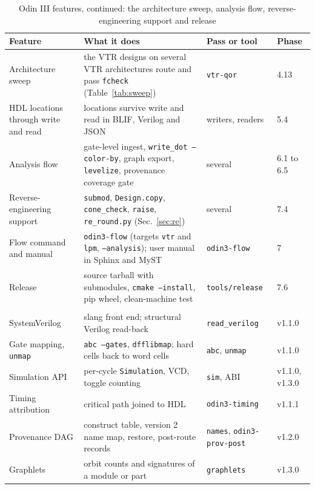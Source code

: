 \documentclass[conference]{IEEEtran}
\newcommand{\code}[1]{\texttt{#1}}
\begin{document}
\begin{table}[!tp]
\caption{Odin III features, continued: the architecture sweep, analysis flow, reverse-engineering support and release}
\label{tab:features2}
\centering
\footnotesize
\begin{tabular}{@{}>{\raggedright\arraybackslash}p{}%
  >{\raggedright\arraybackslash}p{}%
  >{\raggedright\arraybackslash}p{}p{}@{}}
\toprule
Feature & What it does & Pass or tool & Phase \\
\midrule
Architecture sweep & the VTR designs on several VTR architectures route and pass \code{fcheck}
  (Table~\ref{tab:sweep}) & \code{vtr-qor} & 4.13 \\
HDL locations through write and read & locations survive write and read in BLIF, Verilog and JSON
  & writers, readers & 5.4 \\
Analysis flow & gate-level ingest, \code{write\_dot --color-by}, graph export, \code{levelize},
  provenance coverage gate & several & 6.1 to 6.5 \\
Reverse-engineering support & \code{submod}, \code{Design.copy}, \code{cone\_check}, \code{raise},
  \code{re\_round.py} (Sec.~\ref{sec:re}) & several & 7.4 \\
Flow command and manual & \code{odin3-flow} (targets \code{vtr} and \code{lpm}, \code{--analysis});
  user manual in Sphinx and MyST & \code{odin3-flow} & 7 \\
Release & source tarball with submodules, \code{cmake --install}, pip wheel, clean-machine test
  & \code{tools/release} & 7.6 \\
\midrule
\multicolumn{4}{@{}l}{Added after v1.0 (Sec.~\ref{sec:platform}; Appendix~\ref{sec:releases})} \\
SystemVerilog & slang front end; structural Verilog read-back & \code{read\_verilog} & v1.1.0 \\
Gate mapping, \code{unmap} & \code{abc --gates}, \code{dfflibmap}; hard cells back to word cells
  & \code{abc}, \code{unmap} & v1.1.0 \\
Simulation API & per-cycle \code{Simulation}, VCD, toggle counting & \code{sim}, ABI & v1.1.0, v1.3.0 \\
Timing attribution & critical path joined to HDL & \code{odin3-timing} & v1.1.1 \\
Provenance DAG & construct table, version 2 name map, restore, post-route records
  & \code{names}, \code{odin3-prov-post} & v1.2.0 \\
Graphlets & orbit counts and signatures of a module or part & \code{graphlets} & v1.3.0 \\

\end{tabular}
\end{table}
\end{document}
